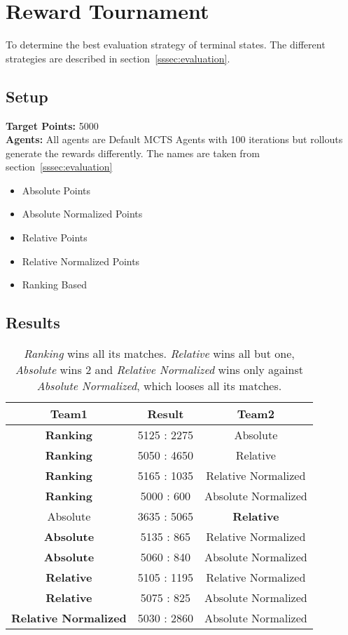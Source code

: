 \section{Reward Tournament}
\label{sec:evaluationexp}
To determine the best evaluation strategy of terminal states. The different strategies are described in section~\ref{sssec:evaluation}.
\subsection*{Setup}
\textbf{Target Points:} 5000\\
\textbf{Agents:}
All agents are Default MCTS Agents with 100 iterations but rollouts generate the rewards differently. The names are taken from section~\ref{sssec:evaluation}
\begin{itemize}
    \setlength\itemsep{2px}
    \item Absolute Points
    \item Absolute Normalized Points
    \item Relative Points
    \item Relative Normalized Points
    \item Ranking Based
\end{itemize}

\subsection*{Results}
\begin{table}[h!]
  \centering
  \begin{tabular}{ccc}
    \textbf{Team1} & \textbf{Result}  & \textbf{Team2}\\
    \hline
    \textbf{Ranking} & 5125 : 2275  & Absolute\\
    \hline
    \textbf{Ranking} & 5050 : 4650  & Relative\\
    \hline
    \textbf{Ranking} & 5165 : 1035  & Relative Normalized\\
    \hline
    \textbf{Ranking} & 5000 : 600  & Absolute Normalized\\
    \hline

    Absolute & 3635 : 5065  & \textbf{Relative}\\
    \hline
    \textbf{Absolute} & 5135 : 865  & Relative Normalized\\
    \hline
    \textbf{Absolute} & 5060 : 840  & Absolute Normalized\\

    \hline
    \textbf{Relative} &  5105 : 1195 & Relative Normalized\\
    \hline
    \textbf{Relative} & 5075 : 825  & Absolute Normalized\\

    \hline
    \textbf{Relative Normalized} & 5030 : 2860  & Absolute Normalized\\
    \hline
  \end{tabular}
  \caption[Result of the Reward Tournament]{\textit{Ranking} wins all its matches. \textit{Relative} wins all but one, \textit{Absolute} wins 2 and \textit{Relative Normalized} wins only against \textit{Absolute Normalized}, which looses all its matches.}
\end{table}

